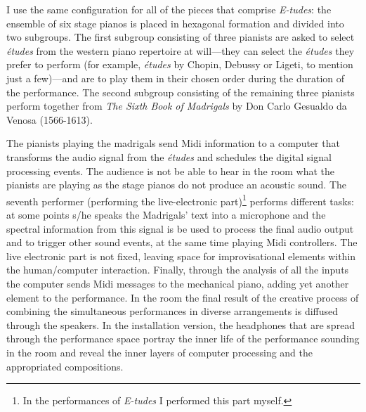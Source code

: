 I use the same configuration for all of the pieces that comprise \emph{E-tudes}: the ensemble of six stage pianos is placed in hexagonal formation and divided into two subgroups. The first subgroup consisting of three pianists are asked to select \emph{\'{e}tudes} from the western piano repertoire at will---they can select the \emph{\'{e}tudes} they prefer to perform (for example, \emph{\'{e}tudes} by Chopin, Debussy or Ligeti, to mention just a few)---and are to play them in their chosen order during the duration of the performance. The second subgroup consisting of the remaining three pianists perform together from \emph{The Sixth Book of Madrigals} by Don Carlo Gesualdo da Venosa (1566-1613). 

The pianists playing the madrigals send Midi information to a computer that transforms the audio signal from the \emph{\'{e}tudes} and schedules the digital signal processing events. The audience is not be able to hear in the room what the pianists are playing as the stage pianos do not produce an acoustic sound. The seventh performer (performing the live-electronic part)\footnote{In the performances of \emph{E-tudes} I performed this part myself.} performs different tasks: at some points s/he speaks the Madrigals' text into a microphone and the spectral information from this signal is be used to process the final audio output and to trigger other sound events, at the same time playing Midi controllers. The live electronic part is not fixed, leaving space for improvisational elements within the human/computer interaction. Finally, through the analysis of all the inputs the computer sends Midi messages to the mechanical piano, adding yet another element to the performance. In the room the final result of the creative process of combining the simultaneous performances in diverse arrangements is diffused through the speakers. In the installation version, the headphones that are spread through the performance space portray the inner life of the performance sounding in the room and reveal the inner layers of computer processing and the appropriated compositions.

